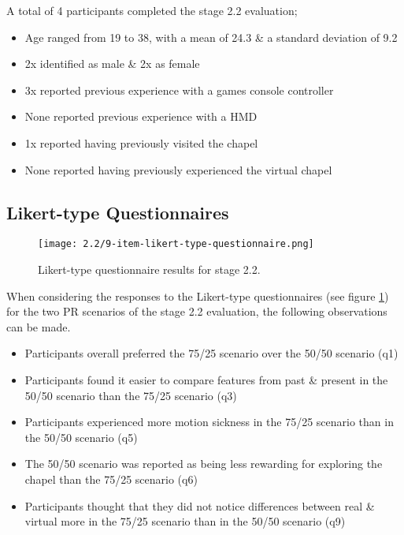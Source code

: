 A total of 4 participants completed the stage 2.2 evaluation;
\begin{itemize}
	\item Age ranged from 19 to 38, with a mean of 24.3 \& a standard deviation of 9.2
	\item 2x identified as male \& 2x as female
	\item 3x reported previous experience with a games console controller
	\item None reported previous experience with a HMD
	\item 1x reported having previously visited the chapel
	\item None reported having previously experienced the virtual chapel
\end{itemize}


\subsection{Likert-type Questionnaires}

\begin{figure}[h]
	\begin{center}
	\texttt{[image: 2.2/9-item-likert-type-questionnaire.png]}
	\caption{Likert-type questionnaire results for stage 2.2.}
	\label{9-item-likert-type-questionnaire.png}
	\end{center}
\end{figure}

When considering the responses to the Likert-type questionnaires (see figure \ref{9-item-likert-type-questionnaire.png}) for the two PR scenarios of the stage 2.2 evaluation, the following observations can be made.

\begin{itemize}
	\item Participants overall preferred the 75/25 scenario over the 50/50 scenario (q1)
	\item Participants found it easier to compare features from past \& present in the 50/50 scenario than the 75/25 scenario (q3)
	\item Participants experienced more motion sickness in the 75/25 scenario than in the 50/50 scenario (q5)
	\item The 50/50 scenario was reported as being less rewarding for exploring the chapel than the 75/25 scenario (q6)
	\item Participants thought that they did not notice differences between real \& virtual more in the 75/25 scenario than in the 50/50 scenario (q9)
\end{itemize}

